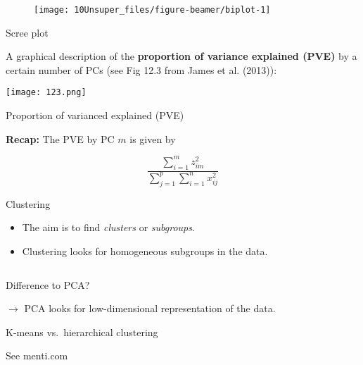 \documentclass[
  10pt,
  ignorenonframetext,
]{beamer}
\begin{document}
\begin{frame}
\begin{figure}
\texttt{[image: 10Unsuper\_files/figure-beamer/biplot-1]} \end{figure}
\end{frame}

\begin{frame}
\begin{block}{Scree plot}
\protect\hypertarget{scree-plot}{}
\(~\)

A graphical description of the \textbf{proportion of variance explained
(PVE)} by a certain number of PCs (see Fig 12.3 from James et al.
(2013)):

\centering

\texttt{[image: 123.png]}
\end{block}
\end{frame}

\begin{frame}
\begin{block}{Proportion of varianced explained (PVE)}
\protect\hypertarget{proportion-of-varianced-explained-pve}{}
\(~\)

\textbf{Recap:} The PVE by PC \(m\) is given by

\[
\frac{\sum_{i=1}^m z_{im}^2} {\sum_{j=1}^p\sum_{i=1}^n x_{ij}^2}
\]
\end{block}
\end{frame}

\begin{frame}{Clustering}
\protect\hypertarget{clustering}{}
\(~\)

\begin{itemize}
\item
  The aim is to find \emph{clusters} or \emph{subgroups}.
\item
  Clustering looks for homogeneous subgroups in the data.
\end{itemize}

\(~\)

Difference to PCA?

\pause

\(\rightarrow\) PCA looks for low-dimensional representation of the
data.
\end{frame}

\begin{frame}
\begin{block}{K-means vs.~hierarchical clustering}
\protect\hypertarget{k-means-vs.-hierarchical-clustering}{}
\(~\)

See menti.com
\end{block}
\end{frame}
\end{document}
